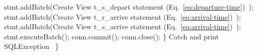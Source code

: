\documentclass{article}
\def\nwendcode{\endtrivlist \endgroup}      %
\let\nwdocspar=\par
\theoremstyle{definition}                   %
\begin{document}
    stmt.addBatch(\LA{}Create View t\_s\_depart statement (Eq.~\ref{eq:departure-time})~{\nwtagstyle{}}\RA{});
    stmt.addBatch(\LA{}Create View t\_r\_arrive statement (Eq.~\ref{eq:arrival-time})~{\nwtagstyle{}}\RA{});
    stmt.addBatch(\LA{}Create View t\_s\_arrive statement (Eq.~\ref{eq:arrival-time})~{\nwtagstyle{}}\RA{});
    stmt.executeBatch();
    conn.commit();
    conn.close();
  \}
  \LA{}Catch and print \code{}SQLException\edoc{}~{\nwtagstyle{}}\RA{}
\}
\eatline
{}\nwendcode{}\nwdocspar
\end{document}
